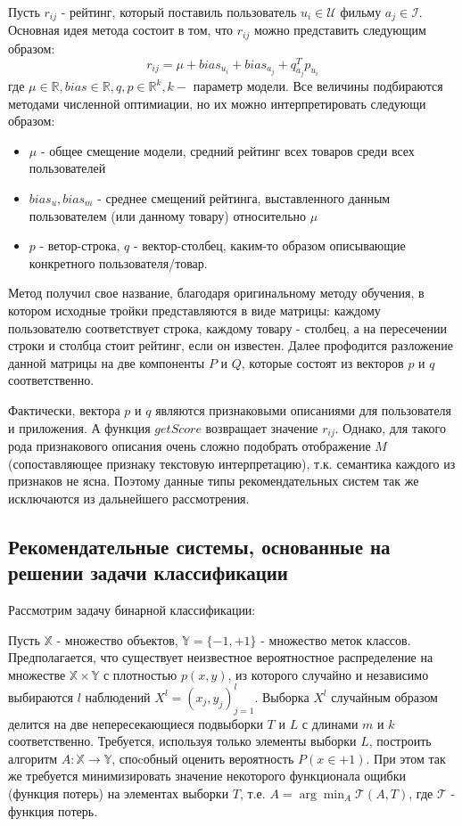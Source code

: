 \documentclass[12pt,a4paper]{report}
\begin{document}
Пусть $r_{ij}$ - рейтинг, который поставиль пользователь $u_i \in \mathcal{U}$ фильму $a_j \in \mathcal{I}$. Основная идея метода состоит в том, что $r_{ij}$ можно представить следующим образом:
\begin{equation*}
r_{ij} = \mu + bias_{u_i} + bias_{a_j} + q_{a_j}^Tp_{u_i}
\end{equation*}
где $\mu \in \mathbb{R}, bias \in \mathbb{R}, q,p \in \mathbb{R}^k, k - $ параметр модели.
Все величины подбираются методами численной оптимиации, но их можно интерпретировать следующи образом:
\begin{itemize}
\item $\mu$ - общее смещение модели, средний рейтинг всех товаров среди всех пользователей
\item $bias_u, bias_m$ - среднее смещений рейтинга, выставленного данным пользователем (или данному товару) относительно $\mu$
\item $p$ - ветор-строка, $q$ - вектор-столбец, каким-то образом описывающие конкретного пользователя/товар.
\end{itemize}

Метод получил свое название, благодаря оригинальному методу обучения, в котором  исходные тройки представляются в виде матрицы: каждому пользователю соответствует строка, каждому товару - столбец, а на пересечении строки и столбца стоит рейтинг, если он известен. Далее профодится разложение данной матрицы на две компоненты $P$ и $Q$, которые состоят из векторов $p$ и $q$ соответственно.

Фактически, вектора $p$ и $q$ являются признаковыми описаниями для пользователя и приложения. А функция $getScore$ возвращает значение $r_{ij}$. Однако, для такого рода признакового описания очень сложно подобрать отображение $M$ (сопоставляющее признаку текстовую интерпретацию), т.к. семантика каждого из признаков не ясна. Поэтому данные типы рекомендательных систем так же исключаются из дальнейшего рассмотрения.
\subsection{Рекомендательные системы, основанные на решении задачи классификации}

Рассмотрим задачу бинарной классификации:

Пусть $\mathbb{X}$ - множество объектов, $\mathbb{Y} = \{-1, +1\}$ - множество меток классов. Предполагается, что существует неизвестное вероятностное распределение на множестве $\mathbb{X} \times \mathbb{Y}$ с плотностью $p(x, y)$, из которого случайно и независимо выбираются $l$ наблюдений $X^l = (x_j, y_j)_{j=1}^l	$. Выборка $X^l$ случайным образом делится на две непересекающиеся подвыборки $T$ и $L$ с длинами $m$ и $k$ соответственно. Требуется, используя только элементы выборки $L$, построить алгоритм $A:\mathbb{X} \to \mathbb{Y}$, споcобный оценить вероятность $P(x \in +1)$. При этом так же требуется минимизировать значение некоторого функционала ощибки (функция потерь) на элементах выборки $T$, т.е. $A = \arg \min_{A}\mathcal{T}(A, T)$, где $\mathcal{T}$ - функция потерь.
\end{document}
